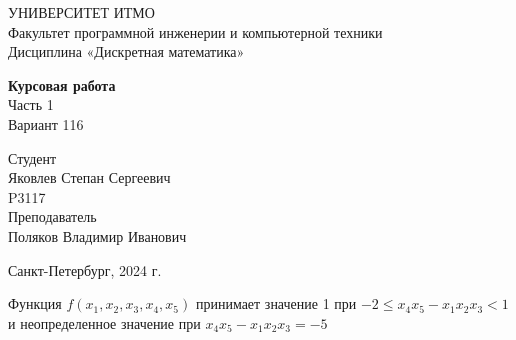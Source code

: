\documentclass{article}
\begin{document}
\begin{center}
    УНИВЕРСИТЕТ ИТМО \\
    Факультет программной инженерии и компьютерной техники \\
    Дисциплина «Дискретная математика»
    
    \vspace{5cm}

    \large
    \textbf{Курсовая работа} \\
    Часть 1 \\
    Вариант 116
\end{center}

\vspace{2cm}

\hfill\begin{minipage}{0.35\linewidth}
Студент \\
Яковлев Степан Сергеевич \\
P3117 \\

Преподаватель \\
Поляков Владимир Иванович
\end{minipage}

\vfill

\begin{center}
    Санкт-Петербург, 2024 г.
\end{center}

\thispagestyle{empty}
\newpage

Функция $f(x_1, x_2, x_3, x_4, x_5)$ принимает значение 1 при $-2 \le x_4 x_5 - x_1 x_2 x_3 < 1$ и неопределенное значение при $x_4 x_5 - x_1 x_2 x_3 = -5$
\end{document}
